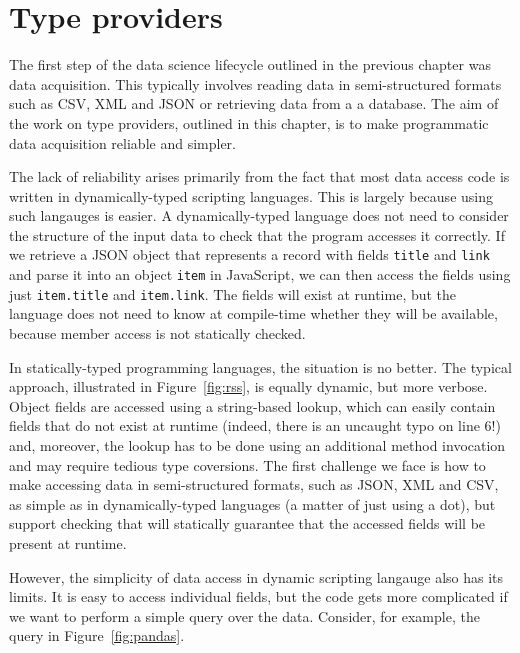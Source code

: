 \documentclass[fleqn,11pt]{report}
\theoremstyle{definition}
\begin{document}

\chapter{Type providers}
\label{ch:tp}

The first step of the data science lifecycle outlined in the previous chapter was data acquisition.
This typically involves reading data in semi-structured formats such as CSV, XML and JSON or
retrieving data from a a database. The aim of the work on type providers, outlined in this chapter,
is to make programmatic data acquisition reliable and simpler.

The lack of reliability arises primarily from the fact that most data access code is written in
dynamically-typed scripting languages. This is largely because using such langauges is easier.
A dynamically-typed language does not need to consider the structure of the input data to
check that the program accesses it correctly. If we retrieve a JSON object that represents a record
with fields \texttt{title} and \texttt{link} and parse it into an object \texttt{item} in
JavaScript, we can then access the fields using just \texttt{item.title} and \texttt{item.link}.
The fields will exist at runtime, but the language does not need to know at compile-time whether
they will be  available, because member access is not statically checked.

In statically-typed programming languages, the situation is no better. The typical approach, illustrated
in Figure~\ref{fig:rss}, is equally dynamic, but more verbose. Object fields are accessed using
a string-based lookup, which can easily contain fields that do not exist at runtime (indeed, there
is an uncaught typo on line 6!) and, moreover, the lookup has to be done using an additional method
invocation and may require tedious type coversions. The first challenge we face is how to
make accessing data in semi-structured formats, such as JSON, XML and CSV, as simple as in
dynamically-typed languages (a matter of just using a dot), but support checking that will
statically guarantee that the accessed fields will be present at runtime.

However, the simplicity of data access in dynamic scripting langauge also has its limits. It is easy to
access individual fields, but the code gets more complicated if we want to perform a simple
query over the data. Consider, for example, the query in Figure~\ref{fig:pandas}.
\end{document}
